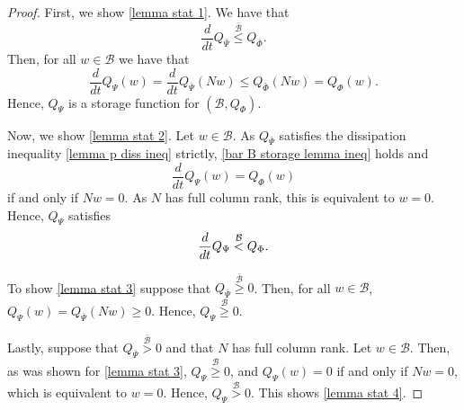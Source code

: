 \documentclass[10pt,a4paper]{amsart}
\newcommand{\B}{\mathcal{B}}
\begin{document}
\begin{proof}
	First, we show \ref{lemma stat 1}. We have that 
	\begin{equation}\frac{d}{dt}Q_{\bar{\Psi}} \stackrel{\bar{\B}}{\leq}Q_{\bar{\Phi}}.\label{lemma p diss ineq}\end{equation} Then, for all $w\in \B$ we have that 
	\begin{equation}\frac{d}{dt}Q_{\Psi}(w) =\frac{d}{dt}Q_{\bar{\Psi}}(Nw) \leq Q_{\bar{\Phi}}(Nw)=Q_\Phi(w). \label{bar B storage lemma ineq}\end{equation}
	Hence, $Q_{\Psi}$ is a storage function for $(\B,Q_{\Phi})$.
	
	Now, we show \ref{lemma stat 2}. Let $w\in \B$. As $Q_{\bar{\Psi}}$ satisfies the dissipation inequality \eqref{lemma p diss ineq} strictly, \eqref{bar B storage lemma ineq} holds and
	\begin{equation*}\frac{d}{dt}Q_{\Psi}(w) =Q_{\Phi}(w)\end{equation*} 
	if and only if $Nw=0$. As $N$ has full column rank, this is equivalent to $w=0$. Hence, $Q_{\Psi}$ satisfies 
	\begin{equation*}\frac{d}{dt}Q_{\Psi} \stackrel{\B}{<}Q_{\Phi}. \vspace{-0.5ex}\end{equation*}
	
	To show \ref{lemma stat 3} suppose that $Q_{\bar{\Psi}} \stackrel{\bar{\B}}{\geq}0$. Then, for all $w\in \B$, $Q_{\Psi}(w)=Q_{\bar{\Psi}}(Nw)\geq 0$. Hence, $Q_{\Psi} \stackrel{\B}{\geq}0$. 
	
	Lastly, suppose that $Q_{\bar{\Psi}} \stackrel{\bar{\B}}{>}0$ and that $N$ has full column rank. Let $w\in \B$. Then, as was shown for \ref{lemma stat 3}, $Q_{\Psi}\stackrel{\B}{\geq}0$, and $Q_{\Psi}(w)=0$ if and only if $Nw=0$, which is equivalent to $w=0$. Hence, $Q_{\Psi} \stackrel{\B}{>}0$. This shows \ref{lemma stat 4}.
\end{proof}
\end{document}
